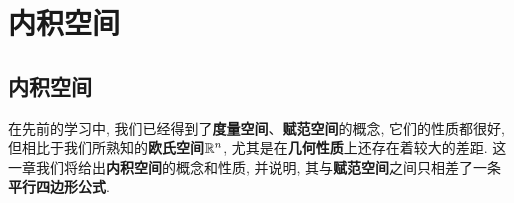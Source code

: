 \ifx\allfiles\undefined


	\else
	\fi
\chapter{内积空间}

\section{内积空间}
	在先前的学习中, 我们已经得到了\textbf{度量空间}、\textbf{赋范空间}的概念, 它们的性质都很好, 但相比于我们所熟知的\textbf{欧氏空间$\mathbb{R}^n$}, 尤其是在\textbf{几何性质}上还存在着较大的差距. 这一章我们将给出\textbf{内积空间}的概念和性质, 并说明, 其与\textbf{赋范空间}之间只相差了一条\textbf{平行四边形公式}. 
	
	\vspace{1em}
	
